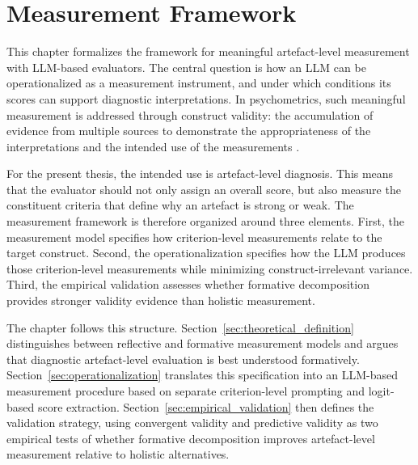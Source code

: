 


\section{Measurement Framework}\label{sec:measurement_framework}

This chapter formalizes the framework for meaningful artefact-level measurement with LLM-based evaluators. The central question is how an LLM can be operationalized as a measurement instrument, and under which conditions its scores can support diagnostic interpretations. In psychometrics, such meaningful measurement is addressed through construct validity: the accumulation of evidence from multiple sources to demonstrate the appropriateness of the interpretations and the intended use of the measurements \citep{messick1989meaning}.

For the present thesis, the intended use is artefact-level diagnosis. This means that the evaluator should not only assign an overall score, but also measure the constituent criteria that define why an artefact is strong or weak. The measurement framework is therefore organized around three elements. First, the measurement model specifies how criterion-level measurements relate to the target construct. Second, the operationalization specifies how the LLM produces those criterion-level measurements while minimizing construct-irrelevant variance. Third, the empirical validation assesses whether formative decomposition provides stronger validity evidence than holistic measurement.

The chapter follows this structure. Section~\ref{sec:theoretical_definition} distinguishes between reflective and formative measurement models and argues that diagnostic artefact-level evaluation is best understood formatively. Section~\ref{sec:operationalization} translates this specification into an LLM-based measurement procedure based on separate criterion-level prompting and logit-based score extraction. Section~\ref{sec:empirical_validation} then defines the validation strategy, using convergent validity and predictive validity as two empirical tests of whether formative decomposition improves artefact-level measurement relative to holistic alternatives.



